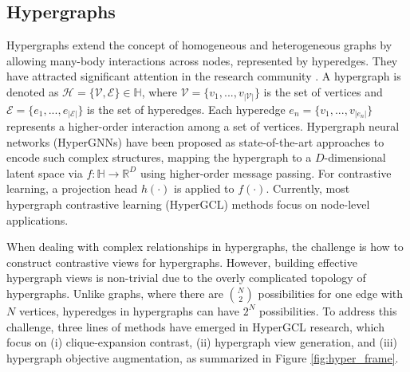 \documentclass[11pt]{article}
\begin{document}
\begin{table}
\vspace{-1em}
 \caption{Five generic augmentation operations for HyperGCL.} \label{tab:hypergraph_operations}
 \vspace{-0.5em}
 \centering
\end{table}

\subsection{Hypergraphs}
Hypergraphs extend the concept of homogeneous and heterogeneous graphs by allowing many-body interactions across nodes, represented by hyperedges. They have attracted significant attention in the research community \cite{feng2019hypergraph, yadati2019hypergcn, chien2021you}. A hypergraph is denoted as $\mathcal{H} = \{ \mathcal{V},\mathcal{E} \} \in \mathbb{H}$, where $\mathcal{V}=\{v_1,...,v_{|\mathcal{V}|}\}$ is the set of vertices and $\mathcal{E}=\{e_1,...,e_{|\mathcal{E}|}\}$ is the set of hyperedges. Each hyperedge $e_n = \{ v_1,...,v_{|e_n|} \}$ represents a higher-order interaction among a set of vertices. Hypergraph neural networks (HyperGNNs) \cite{feng2019hypergraph, yadati2019hypergcn, chien2021you} have been proposed as state-of-the-art approaches to encode such complex structures, mapping the hypergraph to a $D$-dimensional latent space via $f: \mathbb{H} \rightarrow \mathbb{R}^D$ using higher-order message passing. For contrastive learning, a projection head $h(\cdot)$ is applied to $f(\cdot)$. Currently, most hypergraph contrastive learning (HyperGCL) methods focus on node-level applications.

When dealing with complex relationships in hypergraphs, the challenge is how to construct contrastive views for hypergraphs. However, building effective hypergraph views is non-trivial due to the overly complicated topology of hypergraphs. Unlike graphs, where there are $\binom{N}{2}$ possibilities for one edge with $N$ vertices, hyperedges in hypergraphs can have $2^N$ possibilities. To address this challenge, three lines of methods have emerged in HyperGCL research, which focus on (i) clique-expansion contrast, (ii) hypergraph view generation, and (iii) hypergraph objective augmentation, as summarized in Figure \ref{fig:hyper_frame}.
\end{document}
